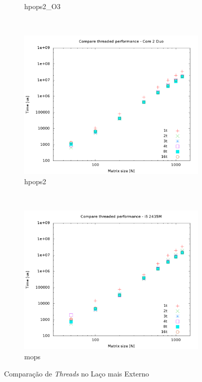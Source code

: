 \documentclass[a4paper, 12pt]{article}
\begin{document}
\begin{figure}[H]
\begin{subfigure}[H]{0.5\textwidth}
        \caption{hpops2\_O3}
        \label{fig:hpops2_O3_par_threads}
    \end{subfigure}
    ~ %
    \begin{subfigure}[H]{0.5\textwidth}
        \includegraphics[width=\textwidth]{hpops2_par_threads}
        \caption{hpops2}
        \label{fig:hpops2_par_threads}
    \end{subfigure}%
    ~ %
    \begin{subfigure}[H]{0.5\textwidth}
        \includegraphics[width=\textwidth]{mops_par_threads}
        \caption{mops}
        \label{fig:mops_par_threads}
    \end{subfigure}
    \caption{Comparação de \textit{Threads} no Laço mais Externo}\label{fig:animals}
\end{figure}
\end{document}
